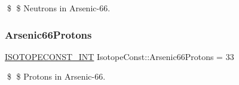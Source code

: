 \$ \$ Neutrons in Arsenic-\/66. \mbox{\label{group___isotope_const-_arsenic-_as66_ga7e68a0c555c6a83d64e2320619a7c468}} 
\subsubsection{\texorpdfstring{Arsenic66\+Protons}{Arsenic66Protons}}
{\footnotesize\ttfamily \mbox{\hyperlink{group___isotope_const-_macros_ga5f18360b3e99483a35c32d789e62621c}{I\+S\+O\+T\+O\+P\+E\+C\+O\+N\+S\+T\+\_\+\+I\+NT}} Isotope\+Const\+::\+Arsenic66\+Protons = 33}

\$ \$ Protons in Arsenic-\/66. 